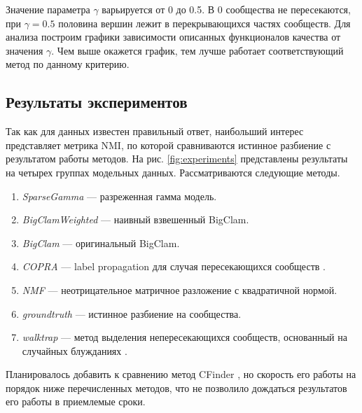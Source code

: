 \documentclass{ITaSconf}
\begin{document}
	Значение параметра $\gamma$ варьируется от 0 до 0.5.
	В 0 сообщества не пересекаются, при $\gamma=0.5$ половина вершин лежит в перекрывающихся частях сообществ.
	Для анализа построим графики зависимости описанных функционалов качества от значения $\gamma$.
	Чем выше окажется график, тем лучше работает соответствующий метод по данному критерию.
	
	\subsection{Результаты экспериментов}
	
	Так как для данных известен правильный ответ, наибольший интерес представляет метрика NMI, по которой сравниваются истинное разбиение с результатом работы методов.
	На рис. \ref{fig:experiments} представлены результаты на четырех группах модельных данных.
	Рассматриваются следующие методы.
	
	\begin{enumerate}
		\item \textit{SparseGamma} --- разреженная гамма модель.
		\item \textit{BigClamWeighted} --- наивный взвешенный BigClam.
		\item \textit{BigClam} --- оригинальный BigClam.
		\item \textit{COPRA} --- label propagation для случая пересекающихся сообществ \cite{gregory2010finding}.
		\item \textit{NMF} --- неотрицательное матричное разложение с квадратичной нормой.
		\item \textit{groundtruth} --- истинное разбиение на сообщества.
		\item \textit{walktrap} --- метод выделения непересекающихся сообществ, основанный на случайных блужданиях \cite{Pascal05}.
	\end{enumerate}
	Планировалось добавить к сравнению метод CFinder \cite{palla2005uncovering}, но скорость его работы на порядок ниже перечисленных методов, что не позволило дождаться результатов его работы в приемлемые сроки.
	
\end{document}
